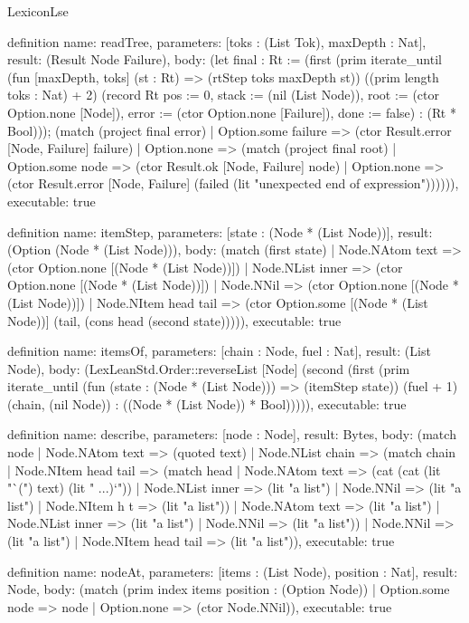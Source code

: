 \begin{lexlean}{LexiconLse}
\begin{semanticmodule}
definition{
  name: readTree,
  parameters: [toks : (List Tok), maxDepth : Nat],
  result: (Result Node Failure),
  body: (let final : Rt := (first (prim iterate_until (fun [maxDepth, toks] (st : Rt) => (rtStep toks maxDepth st)) ((prim length toks : Nat) + 2) (record Rt {pos := 0, stack := (nil (List Node)), root := (ctor Option.none [Node]), error := (ctor Option.none [Failure]), done := false}) : (Rt * Bool))); (match (project final error)
    | Option.some failure => (ctor Result.error [Node, Failure] failure)
    | Option.none => (match (project final root)
      | Option.some node => (ctor Result.ok [Node, Failure] node)
      | Option.none => (ctor Result.error [Node, Failure] (failed (lit "unexpected end of expression")))))),
  executable: true
}

definition{
  name: itemStep,
  parameters: [state : (Node * (List Node))],
  result: (Option (Node * (List Node))),
  body: (match (first state)
    | Node.NAtom text => (ctor Option.none [(Node * (List Node))])
    | Node.NList inner => (ctor Option.none [(Node * (List Node))])
    | Node.NNil => (ctor Option.none [(Node * (List Node))])
    | Node.NItem head tail => (ctor Option.some [(Node * (List Node))] (tail, (cons head (second state))))),
  executable: true
}

definition{
  name: itemsOf,
  parameters: [chain : Node, fuel : Nat],
  result: (List Node),
  body: (LexLeanStd.Order::reverseList [Node] (second (first (prim iterate_until (fun (state : (Node * (List Node))) => (itemStep state)) (fuel + 1) (chain, (nil Node)) : ((Node * (List Node)) * Bool))))),
  executable: true
}

definition{
  name: describe,
  parameters: [node : Node],
  result: Bytes,
  body: (match node
    | Node.NAtom text => (quoted text)
    | Node.NList chain => (match chain
      | Node.NItem head tail => (match head
        | Node.NAtom text => (cat (cat (lit "`(") text) (lit " ...)`"))
        | Node.NList inner => (lit "a list")
        | Node.NNil => (lit "a list")
        | Node.NItem h t => (lit "a list"))
      | Node.NAtom text => (lit "a list")
      | Node.NList inner => (lit "a list")
      | Node.NNil => (lit "a list"))
    | Node.NNil => (lit "a list")
    | Node.NItem head tail => (lit "a list")),
  executable: true
}

definition{
  name: nodeAt,
  parameters: [items : (List Node), position : Nat],
  result: Node,
  body: (match (prim index items position : (Option Node))
    | Option.some node => node
    | Option.none => (ctor Node.NNil)),
  executable: true
}


\end{semanticmodule}
\end{lexlean}
